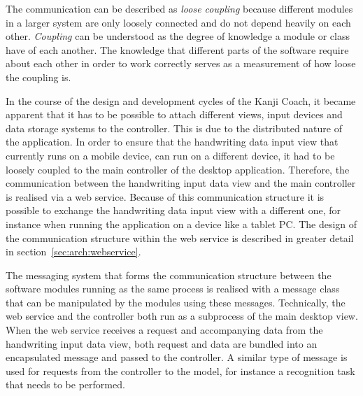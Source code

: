 The communication can be described as \emph{loose coupling} because different 
modules  in a larger system are only loosely connected and do not depend 
heavily on each other. \emph{Coupling} can be understood as the degree 
of knowledge a module or class have of each another. 
The knowledge that different parts of the software
require about each other in order to work correctly serves as a measurement of
how loose the coupling is.

In the course of the design and development cycles of the Kanji Coach, 
it became apparent that it has to be possible to attach different views, 
input devices and data storage systems to the controller. This is due to the 
distributed nature of the application. 
In order to ensure that the handwriting data input view that currently runs 
on a mobile device, can run on a different device, it had to be loosely coupled 
to the main controller of the desktop application. 
Therefore, the communication between the handwriting 
input data view and the main controller is realised via a web service. 
Because of this communication structure it is possible to exchange the 
handwriting data input view with a different one, for instance when running 
the application on a device like a tablet PC. The design of the communication 
structure within the web service is described in greater detail 
in section~\ref{sec:arch:webservice}.

The messaging system that forms the communication structure between the software 
modules running as the same process is realised with a message class that
can be manipulated by the modules using these messages.
Technically, the web service and the controller both run as a subprocess of the 
main desktop view. When the web service receives a request and accompanying data
from the handwriting input data view, both request and data are bundled into an 
encapsulated message and passed to the controller. A similar type of message 
is used for requests from the controller to the model, for instance a recognition
task that needs to be performed.



